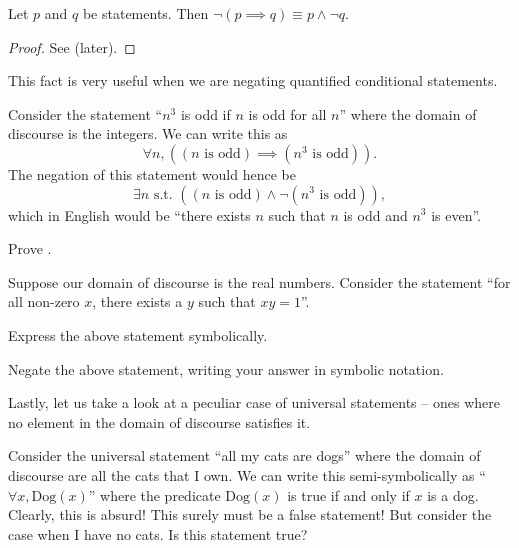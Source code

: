 \begin{proposition}\label{prop:negating-conditional}
    Let $p$ and $q$ be statements. Then $\lnot (p \implies q) \equiv p \land \lnot q$.
\end{proposition}
\begin{proof}
    See  (later).
\end{proof}

This fact is very useful when we are negating quantified conditional statements.

\begin{example}
    Consider the statement ``$n^3$ is odd if $n$ is odd for all $n$'' where the domain of discourse is the integers. We can write this as
    \[
        \forall n, ((n \text{ is odd}) \implies (n^3 \text{ is odd})).
    \]
    The negation of this statement would hence be
    \[
        \exists n \text{ s.t. } ((n \text{ is odd}) \land \lnot(n^3 \text{ is odd})),
    \]
    which in English would be ``there exists $n$ such that $n$ is odd and $n^3$ is even''.
\end{example}

\begin{exercise}\label{exercise:negating-conditional}
    Prove .
\end{exercise}

\begin{exercise}
    Suppose our domain of discourse is the real numbers. Consider the statement ``for all non-zero $x$, there exists a $y$ such that $xy = 1$''.
    \begin{partquestions}{\roman*}
        \item Express the above statement symbolically.
        \item Negate the above statement, writing your answer in symbolic notation.
    \end{partquestions}
\end{exercise}

Lastly, let us take a look at a peculiar case of universal statements -- ones where no element in the domain of discourse satisfies it.

Consider the universal statement ``all my cats are dogs'' where the domain of discourse are all the cats that I own. We can write this semi-symbolically as ``$\forall x, \mathrm{Dog}(x)$'' where the predicate $\mathrm{Dog}(x)$ is true if and only if $x$ is a dog. Clearly, this is absurd! This surely must be a false statement! But consider the case when I have no cats. Is this statement true?


